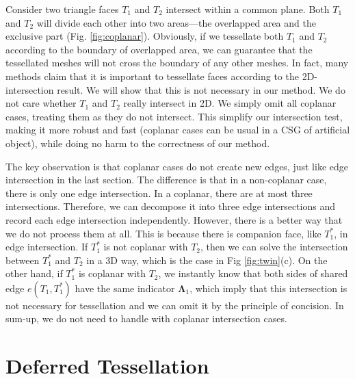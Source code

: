 \documentclass[10pt,journal,compsoc]{IEEEtran}
\begin{document}
Consider two triangle faces $T_1$ and $T_2$ intersect within a common plane. Both $T_1$ and $T_2$ will divide each other into two areas---the overlapped area and the exclusive part (Fig. \ref{fig:coplanar}). Obviously, if we tessellate both $T_1$ and $T_2$ according to the boundary of overlapped area, we can guarantee that the tessellated meshes will not cross the boundary of any other meshes. In fact, many methods \cite{feito2013fast} claim that it is important to tessellate faces according to the 2D-intersection result. We will show that this is not necessary in our method. We do not care whether $T_1$ and $T_2$ really intersect in 2D. We simply omit all coplanar cases, treating them as they do not intersect. This simplify our intersection test, making it more robust and fast (coplanar cases can be usual in a CSG of artificial object), while doing no harm to the correctness of our method.

The key observation is that coplanar cases do not create new edges, just like edge intersection in the last section. The difference is that in a non-coplanar case, there is only one edge intersection. In a coplanar, there are at most three intersections. Therefore, we can decompose it into three edge intersections and record each edge intersection independently. However, there is a better way that we do not process them at all. This is because there is companion face, like $T_1^*$, in edge intersection. If $T_1^*$ is not coplanar with $T_2$, then we can solve the intersection between $T_1^*$ and $T_2$ in a 3D way, which is the case in Fig \ref{fig:twin}(c). On the other hand, if $T_1^*$ is coplanar with $T_2$, we instantly know that both sides of shared edge $e(T_1, T_1^*)$ have the same indicator $\boldsymbol{\Lambda}_1$, which imply that this intersection is not necessary for tessellation and we can omit it by the principle of concision. In sum-up, we do not need to handle with coplanar intersection cases.

\section{Deferred Tessellation}

{\color{red}{red alert start}}
\end{document}
